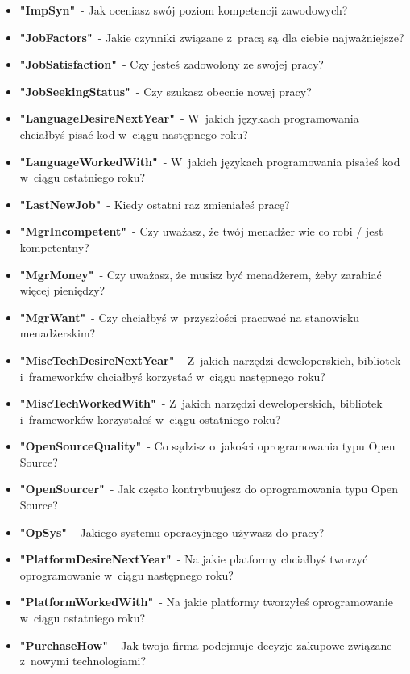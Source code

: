 \begin{appendices}
\begin{itemize}
        \item \textbf{"ImpSyn"}~- Jak oceniasz swój poziom kompetencji zawodowych?
        \item \textbf{"JobFactors"}~- Jakie czynniki związane z~pracą są dla ciebie najważniejsze?
        \item \textbf{"JobSatisfaction"}~- Czy jesteś zadowolony ze swojej pracy?
        \item \textbf{"JobSeekingStatus"}~- Czy szukasz obecnie nowej pracy?
        \item \textbf{"LanguageDesireNextYear"}~- W~jakich językach programowania chciałbyś pisać kod w~ciągu następnego roku?
        \item \textbf{"LanguageWorkedWith"}~- W~jakich językach programowania pisałeś kod w~ciągu ostatniego roku?
        \item \textbf{"LastNewJob"}~- Kiedy ostatni raz zmieniałeś pracę?
        \item \textbf{"MgrIncompetent"}~- Czy uważasz, że twój menadżer wie co robi / jest kompetentny?
        \item \textbf{"MgrMoney"}~- Czy uważasz, że musisz być menadżerem, żeby zarabiać więcej pieniędzy?
        \item \textbf{"MgrWant"}~- Czy chciałbyś w~przyszłości pracować na stanowisku menadżerskim?
        \item \textbf{"MiscTechDesireNextYear"}~- Z~jakich narzędzi deweloperskich, bibliotek i~frameworków chciałbyś korzystać w~ciągu następnego roku?
        \item \textbf{"MiscTechWorkedWith"}~- Z~jakich narzędzi deweloperskich, bibliotek i~frameworków korzystałeś w~ciągu ostatniego roku?
        \item \textbf{"OpenSourceQuality"}~- Co sądzisz o~jakości oprogramowania typu Open Source?
        \item \textbf{"OpenSourcer"}~- Jak często kontrybuujesz do oprogramowania typu Open Source?
        \item \textbf{"OpSys"}~- Jakiego systemu operacyjnego używasz do pracy?
        \item \textbf{"PlatformDesireNextYear"}~- Na jakie platformy chciałbyś tworzyć oprogramowanie w~ciągu następnego roku?
        \item \textbf{"PlatformWorkedWith"}~- Na jakie platformy tworzyłeś oprogramowanie w~ciągu ostatniego roku?
        \item \textbf{"PurchaseHow"}~- Jak twoja firma podejmuje decyzje zakupowe związane z~nowymi technologiami?

\end{itemize}
\end{appendices}
